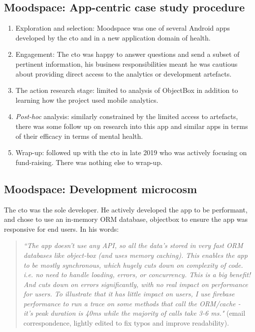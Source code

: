 \subsection{Moodspace: App-centric case study procedure}
{\small
\begin{enumerate}
    \itemsep0em
    \item Exploration and selection: Moodspace was one of several Android apps developed by the \acrshort{cto} and in a new application domain of health. 
    \item Engagement: The \acrshort{cto} was happy to answer questions and send a subset of pertinent information, his business responsibilities meant he was cautious about providing direct access to the analytics or development artefacts. 
    \item The action research stage: limited to analysis of ObjectBox in addition to learning how the project used mobile analytics.
    \item \textit{Post-hoc} analysis: similarly constrained by the limited access to artefacts, there was some follow up on research into this app and similar apps in terms of their efficacy in terms of mental health.
    \item Wrap-up: followed up with the \acrshort{cto} in late 2019 who was actively focusing on fund-raising. There was nothing else to wrap-up.
\end{enumerate}
}


\subsection{Moodspace: Development microcosm}
The \acrshort{cto} was the sole developer. He actively developed the app to be performant, and chose to use an in-memory ORM database, objectbox to ensure the app was responsive for end users. In his words: 

\begin{quote}
\emph{``The app doesn't use any API, so all the data's stored in very fast ORM databases like object-box (and uses memory caching). This enables the app to be mostly synchronous, which hugely cuts down on complexity of code. i.e. no need to handle loading, errors, or concurrency. This is a big benefit! And cuts down on errors significantly, with no real impact on performance for users. To illustrate that it has little impact on users, I use firebase performance to run a trace on some methods that call the ORM/cache - it's peak duration is 40ms while the majority of calls take 3-6 ms."} (email correspondence, lightly edited to fix typos and improve readability).    
\end{quote}


